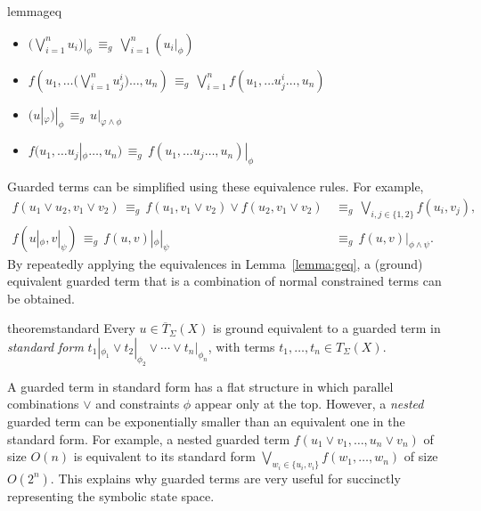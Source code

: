 \begin{restatable}{lemma}{geq}
\label{lemma:geq}
\begin{itemize}
	\item $\big(\bigvee_{i=1}^n u_i \big) |_\phi \,\equiv_g\, \bigvee_{i=1}^n (u_i  |_\phi)$
	
	\item $ f(u_1,\ldots \big(\bigvee_{i=1}^n u_j^i\big) \ldots,u_n) \,\equiv_g\, \bigvee_{i=1}^n f(u_1,\ldots u_j^i \ldots,u_n)$

	\item $\big(u |_\varphi\big) |_\phi \,\equiv_g\, u |_{\varphi \wedge \phi}$
	
	\item $f(u_1,\ldots u_j |_\phi \ldots,u_n) \,\equiv_g\, f(u_1,\ldots u_j \ldots,u_n) |_\phi$ 

\end{itemize}
\end{restatable}

\noindent Guarded terms can be simplified using these equivalence
rules.  For example, 
\begin{align*}
f(u_1 \vee u_2, v_1 \vee v_2) \,\equiv_g\,
f(u_1, v_1 \vee v_2) \vee f(u_2, v_1 \vee v_2) &\,\equiv_g\,
\textstyle
\bigvee_{i,j \in \{1,2\}} f(u_i,v_j),
\\
f(u |_{\phi}, v |_{\psi})
\,\equiv_g\, f(u, v) |_{\phi} |_{\psi} &\,\equiv_g\, f(u, v) |_{\phi
  \wedge \psi}.
\end{align*}
By repeatedly applying the equivalences in
Lemma~\ref{lemma:geq}, a (ground) equivalent guarded term that is a
combination of normal constrained terms can be obtained.

\begin{restatable}{theorem}{standard}
\label{thm:standard}
Every $u \in \overline{T}_{\Sigma}(X)$ is ground equivalent to a
guarded term in \emph{standard form} $t_1 |_{\phi_1} \lor t_2
|_{\phi_2} \lor \cdots \lor t_n |_{\phi_n}$, with terms $t_1, \ldots,
t_n \in T_\Sigma(X)$.
\end{restatable}

\noindent A guarded term in standard form has a flat structure in
which parallel combinations $\vee$ and constraints $\phi$ appear only
at the top.  However, a \emph{nested} guarded term can be exponentially
smaller than an equivalent one in the standard form.  For example, a
nested guarded term $f(u_1 \vee v_1, \ldots, u_n \vee v_n)$ of size
$O(n)$ is equivalent to its standard form $\bigvee_{w_i \in \{u_i,
  v_i\}} f(w_1, \ldots, w_n)$ of size $O(2^n)$.
This explains why guarded terms are very useful 
for succinctly representing the symbolic state space.
  


